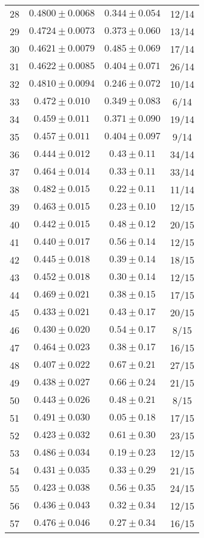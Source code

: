 \begin{tabular}{c|c|c|c}
28 & $0.4800\pm0.0068$ & $0.344\pm0.054$ & 12/14 \\
29 & $0.4724\pm0.0073$ & $0.373\pm0.060$ & 13/14 \\
30 & $0.4621\pm0.0079$ & $0.485\pm0.069$ & 17/14 \\
31 & $0.4622\pm0.0085$ & $0.404\pm0.071$ & 26/14 \\
32 & $0.4810\pm0.0094$ & $0.246\pm0.072$ & 10/14 \\
33 & $0.472\pm0.010$ & $0.349\pm0.083$ & 6/14 \\
34 & $0.459\pm0.011$ & $0.371\pm0.090$ & 19/14 \\
35 & $0.457\pm0.011$ & $0.404\pm0.097$ & 9/14 \\
36 & $0.444\pm0.012$ & $0.43\pm0.11$ & 34/14 \\
37 & $0.464\pm0.014$ & $0.33\pm0.11$ & 33/14 \\
38 & $0.482\pm0.015$ & $0.22\pm0.11$ & 11/14 \\
39 & $0.463\pm0.015$ & $0.23\pm0.10$ & 12/15 \\
40 & $0.442\pm0.015$ & $0.48\pm0.12$ & 20/15 \\
41 & $0.440\pm0.017$ & $0.56\pm0.14$ & 12/15 \\
42 & $0.445\pm0.018$ & $0.39\pm0.14$ & 18/15 \\
43 & $0.452\pm0.018$ & $0.30\pm0.14$ & 12/15 \\
44 & $0.469\pm0.021$ & $0.38\pm0.15$ & 17/15 \\
45 & $0.433\pm0.021$ & $0.43\pm0.17$ & 20/15 \\
46 & $0.430\pm0.020$ & $0.54\pm0.17$ & 8/15 \\
47 & $0.464\pm0.023$ & $0.38\pm0.17$ & 16/15 \\
48 & $0.407\pm0.022$ & $0.67\pm0.21$ & 27/15 \\
49 & $0.438\pm0.027$ & $0.66\pm0.24$ & 21/15 \\
50 & $0.443\pm0.026$ & $0.48\pm0.21$ & 8/15 \\
51 & $0.491\pm0.030$ & $0.05\pm0.18$ & 17/15 \\
52 & $0.423\pm0.032$ & $0.61\pm0.30$ & 23/15 \\
53 & $0.486\pm0.034$ & $0.19\pm0.23$ & 12/15 \\
54 & $0.431\pm0.035$ & $0.33\pm0.29$ & 21/15 \\
55 & $0.423\pm0.038$ & $0.56\pm0.35$ & 24/15 \\
56 & $0.436\pm0.043$ & $0.32\pm0.34$ & 12/15 \\
57 & $0.476\pm0.046$ & $0.27\pm0.34$ & 16/15 \\

\end{tabular}
